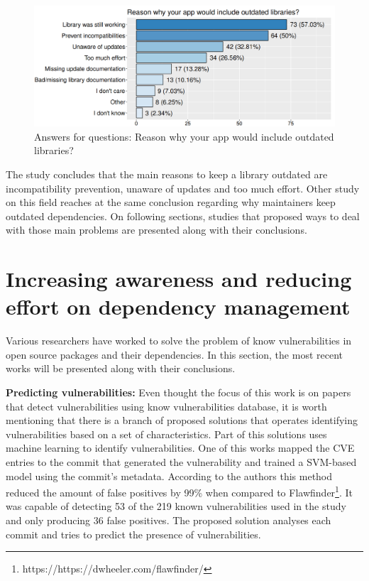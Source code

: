 \documentclass[pdf,bookmarks,colorlinks=true]{IEEEtran}
\begin{document}
\begin{figure}[h]
	\centering
	\includegraphics[scale=0.28]{ReasonsOutdatedLibrary.png}
	\caption{Answers for questions: Reason why your app would include outdated libraries?}
	\label{ReasonsOutdatedLibrary}
\end{figure}

The study concludes that the main reasons to keep a library outdated are incompatibility prevention, unaware of updates and too much effort. Other study on this field \cite{Kula2018} reaches at the same conclusion regarding why maintainers keep outdated dependencies. On following sections, studies that proposed ways to deal with those main problems are presented along with their conclusions.

\section{Increasing awareness and reducing effort on dependency management}
\label{sec:IncreasingAwarenessReducingEffort}

Various researchers have worked to solve the problem of know vulnerabilities in open source packages and their dependencies. In this section, the most recent works will be presented along with their conclusions.

\textbf{Predicting vulnerabilities:}
Even thought the focus of this work is on papers that detect vulnerabilities using know vulnerabilities database, it is worth mentioning that there is a branch of proposed solutions that operates identifying vulnerabilities based on a set of characteristics. Part of this solutions uses machine learning to identify vulnerabilities. One of this works \cite{Perl2015} mapped the CVE entries to the commit that generated the vulnerability and trained a SVM-based model using the commit's metadata. According to the authors this method reduced the amount of false positives by 99\% when compared to Flawfinder\footnote{https://https://dwheeler.com/flawfinder/}. It was capable of detecting 53 of the 219 known vulnerabilities used in the study and only producing 36 false positives. The proposed solution analyses each commit and tries to predict the presence of vulnerabilities.
\end{document}
